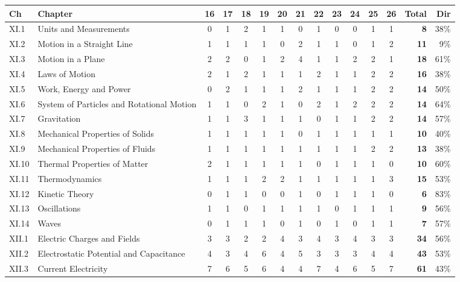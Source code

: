{\footnotesize\setlength{\tabcolsep}{2.6pt}\renewcommand{\arraystretch}{1.12}
\begin{tabularx}{\linewidth}{@{}l>{\raggedright\arraybackslash}X*{11}{c}rr@{}}\toprule
Ch & Chapter & 16 & 17 & 18 & 19 & 20 & 21 & 22 & 23 & 24 & 25 & 26 & Total & Dir\\\midrule
XI.1 & Units and Measurements & 0 & 1 & 2 & 1 & 1 & 0 & 1 & 0 & 0 & 1 & 1 & \textbf{8} & 38\%\\
XI.2 & Motion in a Straight Line & 1 & 1 & 1 & 1 & 0 & 2 & 1 & 1 & 0 & 1 & 2 & \textbf{11} & 9\%\\
XI.3 & Motion in a Plane & 2 & 2 & 0 & 1 & 2 & 4 & 1 & 1 & 2 & 2 & 1 & \textbf{18} & 61\%\\
XI.4 & Laws of Motion & 2 & 1 & 2 & 1 & 1 & 1 & 2 & 1 & 1 & 2 & 2 & \textbf{16} & 38\%\\
XI.5 & Work, Energy and Power & 0 & 2 & 1 & 1 & 1 & 2 & 1 & 1 & 1 & 2 & 2 & \textbf{14} & 50\%\\
XI.6 & System of Particles and Rotational Motion & 1 & 1 & 0 & 2 & 1 & 0 & 2 & 1 & 2 & 2 & 2 & \textbf{14} & 64\%\\
XI.7 & Gravitation & 1 & 1 & 3 & 1 & 1 & 1 & 0 & 1 & 1 & 2 & 2 & \textbf{14} & 57\%\\
XI.8 & Mechanical Properties of Solids & 1 & 1 & 1 & 1 & 1 & 0 & 1 & 1 & 1 & 1 & 1 & \textbf{10} & 40\%\\
XI.9 & Mechanical Properties of Fluids & 1 & 1 & 1 & 1 & 1 & 1 & 1 & 1 & 1 & 2 & 2 & \textbf{13} & 38\%\\
XI.10 & Thermal Properties of Matter & 2 & 1 & 1 & 1 & 1 & 1 & 0 & 1 & 1 & 1 & 0 & \textbf{10} & 60\%\\
XI.11 & Thermodynamics & 1 & 1 & 1 & 2 & 2 & 1 & 1 & 1 & 1 & 1 & 3 & \textbf{15} & 53\%\\
XI.12 & Kinetic Theory & 0 & 1 & 1 & 0 & 0 & 1 & 0 & 1 & 1 & 1 & 0 & \textbf{6} & 83\%\\
XI.13 & Oscillations & 1 & 1 & 0 & 1 & 1 & 1 & 1 & 0 & 1 & 1 & 1 & \textbf{9} & 56\%\\
XI.14 & Waves & 0 & 1 & 1 & 1 & 0 & 1 & 0 & 1 & 0 & 1 & 1 & \textbf{7} & 57\%\\
\midrule
XII.1 & Electric Charges and Fields & 3 & 3 & 2 & 2 & 4 & 3 & 4 & 3 & 4 & 3 & 3 & \textbf{34} & 56\%\\
XII.2 & Electrostatic Potential and Capacitance & 4 & 3 & 4 & 6 & 4 & 5 & 3 & 3 & 3 & 4 & 4 & \textbf{43} & 53\%\\
XII.3 & Current Electricity & 7 & 6 & 5 & 6 & 4 & 4 & 7 & 4 & 6 & 5 & 7 & \textbf{61} & 43\%\\

\end{tabularx}}
